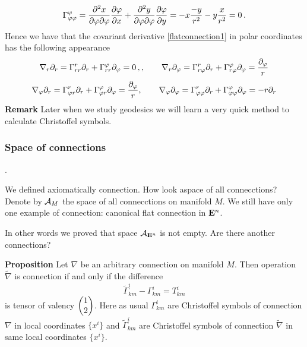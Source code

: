 \documentclass[12pt]{article}
\theoremstyle{theorem}
\numberwithin{equation}{section}
\begin{document}
             \begin{equation}\label{clhristoffelsymbolsinpolarcoordinates2}
                \Gamma^\varphi_{\varphi\varphi}=
        {\partial^2 x\over \partial \varphi\partial \varphi}{\partial \varphi\over \partial x}+
        {\partial^2 y\over \partial \varphi\partial \varphi}{\partial \varphi\over \partial y}=
        -x{-y\over r^2}-y{x\over r^2}=0\,.
                     \end{equation}
       Hence  we have that the covariant derivative \eqref{flatconnection1}
        in polar coordinates has the following appearance
                  \begin{equation*}
                  \nabla_r \partial_r=
                  \Gamma_{rr}^r\partial_r+
                  \Gamma_{rr}^\varphi\partial_\varphi=0\,,
                  , \qquad
                  \nabla_r\partial_\varphi=\Gamma_{r\varphi}^r\partial_r+
                  \Gamma_{r\varphi}^\varphi\partial_\varphi={\partial_\varphi\over r}
                  \end{equation*}
                  \begin{equation}\label{covariantderivativeinpolarcoordinates}
                  \nabla_\varphi \partial_r=
                  \Gamma_{\varphi r}^r\partial_r+
                  \Gamma_{\varphi r}^\varphi\partial_\varphi={\partial_\varphi\over r}, \qquad
                  \nabla_\varphi\partial_\varphi=\Gamma_{\varphi\varphi}^r\partial_r+
                  \Gamma_{\varphi\varphi}^\varphi\partial_\varphi=-r\partial_r
                  \end{equation}
{\bf Remark}  Later when we study geodesics we will learn a very quick method to calculate
Christoffel symbols.




\subsubsection {Space of connections}.

\def\A {{\cal A}}
 We defined axiomatically connection. 
 How look aspace of all connecctions?
 Denote by $\A_M$ the space of all connecctions on manifold $M$.
 We still have
 only one example of connection: canonical flat  connection in ${\bf E}^n$.

 In other words we proved that space ${\cal A}_{{\bf E}^n}$ is not empty.
 Are there another connections?

 {\bf Proposition} Let $\nabla$ be an arbitrary connection on manifold $M$.
   Then operation $\widetilde\nabla$ is connection if and only if
   the difference 
      \begin{equation}\label{differeceofconnections}
	      \widetilde \Gamma^i_{km}
	       -
	      \Gamma^i_{km}=T^i_{km}
      \end{equation}
is tensor of valency $\begin{pmatrix}1\cr 2\cr\end{pmatrix}$.
	Here as usual $\Gamma^i_{km}$ are Christoffel symbols
	of connection $\nabla$ in local coordinates
	$\{x^i\}$ and 
	 $\widetilde \Gamma^i_{km}$ are Christoffel symbols
	of connection $\widetilde \nabla$ in same local coordinates
	$\{x^i\}$.
\end{document}
